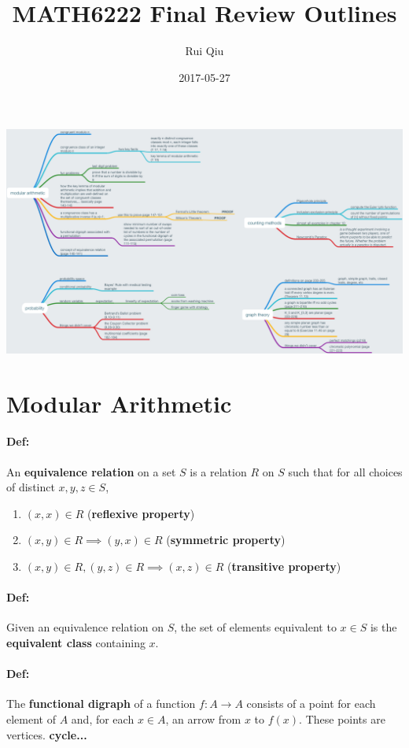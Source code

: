 \documentclass[a4paper, 11pt, twoside]{article}
\begin{document}
\title{MATH6222 Final Review Outlines}
\author{Rui Qiu}
\date{2017-05-27}

\maketitle

\includegraphics[width=\textwidth]{6222-mindmap}

\section{Modular Arithmetic}

\paragraph{Def:} An \textbf{equivalence relation} on a set $S$ is a relation $R$ on $S$ such that for all choices of distinct $x,y,z\in S$,
\begin{enumerate}
	\item $(x,x)\in R$ (\textbf{reflexive property})
	\item $(x,y)\in R \implies (y,x)\in R$ (\textbf{symmetric property})
	\item $(x,y)\in R, (y,z)\in R \implies (x,z)\in R$ (\textbf{transitive property})
\end{enumerate}

\paragraph{Def:} Given an equivalence relation on $S$, the set of elements equivalent to $x\in S$ is the \textbf{equivalent class} containing $x$.

\paragraph{Def:} The \textbf{functional digraph} of a function $f: A\rightarrow A$ consists of a point for each element of $A$ and, for each $x\in A$, an arrow from $x$ to $f(x).$ These points are vertices. \textbf{cycle...}
\end{document}
